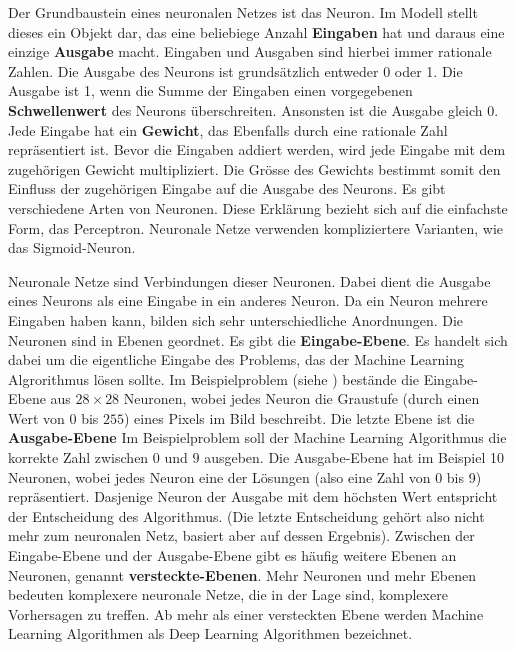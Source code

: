 Der Grundbaustein eines neuronalen Netzes ist das Neuron. Im Modell stellt
dieses ein Objekt dar, das eine beliebiege Anzahl \textbf{Eingaben} hat und
daraus eine einzige \textbf{Ausgabe} macht. Eingaben und Ausgaben sind hierbei
immer rationale Zahlen. Die Ausgabe des Neurons ist grundsätzlich entweder 0
oder 1. Die Ausgabe ist 1, wenn die Summe der Eingaben einen vorgegebenen
\textbf{Schwellenwert} des Neurons überschreiten. Ansonsten ist die Ausgabe
gleich 0. Jede Eingabe hat ein \textbf{Gewicht}, das Ebenfalls durch eine
rationale Zahl repräsentiert ist. Bevor die Eingaben addiert werden, wird jede
Eingabe mit dem zugehörigen Gewicht multipliziert. Die Grösse des Gewichts
bestimmt somit den Einfluss der zugehörigen Eingabe auf die Ausgabe des Neurons.
Es gibt verschiedene Arten von Neuronen. Diese Erklärung bezieht sich auf die
einfachste Form, das Perceptron. Neuronale Netze verwenden kompliziertere
Varianten, wie das Sigmoid-Neuron.


Neuronale Netze sind Verbindungen dieser Neuronen. Dabei dient die Ausgabe eines
Neurons als eine Eingabe in ein anderes Neuron. Da ein Neuron mehrere Eingaben
haben kann, bilden sich sehr unterschiedliche Anordnungen. Die Neuronen sind in
Ebenen geordnet. Es gibt die \textbf{Eingabe-Ebene}. Es handelt sich dabei um
die eigentliche Eingabe des Problems, das der Machine Learning Algrorithmus
lösen sollte. Im Beispielproblem (siehe ) bestände die Eingabe-Ebene aus
$28\times28$ Neuronen, wobei jedes Neuron die Graustufe (durch einen Wert von 0
bis $255$) eines Pixels im Bild beschreibt. Die letzte Ebene ist die
\textbf{Ausgabe-Ebene} Im Beispielproblem soll der Machine Learning Algorithmus
die korrekte Zahl zwischen $0$ und $9$ ausgeben. Die Ausgabe-Ebene hat im Beispiel
10 Neuronen, wobei jedes Neuron eine der Lösungen (also eine Zahl von 0 bis 9)
repräsentiert. Dasjenige Neuron der Ausgabe mit dem höchsten Wert entspricht der  %
Entscheidung des Algorithmus. (Die letzte Entscheidung gehört also nicht mehr
zum neuronalen Netz, basiert aber auf dessen Ergebnis). Zwischen der
Eingabe-Ebene und der Ausgabe-Ebene gibt es häufig weitere Ebenen an Neuronen,
genannt \textbf{versteckte-Ebenen}. Mehr Neuronen und mehr Ebenen bedeuten
komplexere neuronale Netze, die in der Lage sind, komplexere Vorhersagen zu
treffen. Ab mehr als einer versteckten Ebene werden Machine Learning Algorithmen
als Deep Learning Algorithmen bezeichnet.

